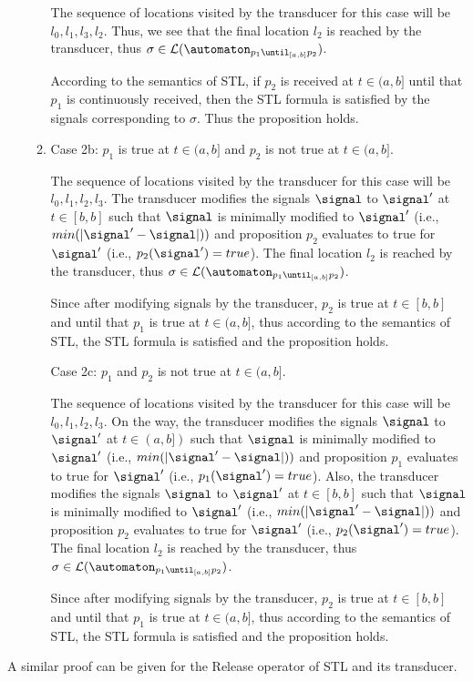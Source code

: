 \begin{enumerate}
\begin{enumerate}
            The sequence of locations visited by the transducer for this case will be $l_0, l_1, l_3, l_2$. Thus, we see that the final location $l_2$ is reached by the transducer, thus $\sigma \in \mathcal{L}(\automaton_{p_1\until_{[a,b]}p_2})$.

            According to the semantics of STL, if $p_2$ is received at $t\in (a,b]$ until that $p_1$ is continuously received, then the STL formula is satisfied by the signals corresponding to $\sigma$. Thus the proposition holds.

            \item Case 2b: $p_1$ is true at $t \in 
            (a,b]$ and $p_2$ is not true at $t\in(a,b]$.

            The sequence of locations visited by the transducer for this case will be $l_0, l_1, l_2, l_3$. The transducer modifies the signals $\signal$ to $\signal'$  at $t \in [b,b]$ such that $\signal$ is minimally modified to $\signal'$ (i.e., $min(|\signal'-\signal|))$ and  proposition $p_2$ evaluates to true for $\signal'$ (i.e., $p_2(\signal')=true$). The final location $l_2$ is reached by the transducer, thus $\sigma \in \mathcal{L}(\automaton_{p_1\until_{[a,b]}p_2})$.

            Since after modifying signals by the transducer, $p_2$ is true at $t \in [b,b]$ and until that $p_1$ is true at $t\in (a,b]$, thus according to the semantics of STL, the STL formula is satisfied and the proposition holds.

             Case 2c: $p_1$ and $p_2$ is not true at $t\in(a,b]$.

             The sequence of locations visited by the transducer for this case will be $l_0, l_1, l_2, l_3$. On the way, the transducer modifies the signals $\signal$ to $\signal'$  at $t \in (a,b])$ such that $\signal$ is minimally modified to $\signal'$ (i.e., $min(|\signal'-\signal|))$ and  proposition $p_1$ evaluates to true for $\signal'$ (i.e., $p_1(\signal')=true$). Also, the transducer modifies the signals $\signal$ to $\signal'$  at $t \in [b,b]$ such that $\signal$ is minimally modified to $\signal'$ (i.e., $min(|\signal'-\signal|))$ and  proposition $p_2$ evaluates to true for $\signal'$ (i.e., $p_2(\signal')=true$).              
             The final location $l_2$ is reached by the transducer, thus $\sigma \in \mathcal{L}(\automaton_{p_1\until_{[a,b]}p_2})$.

             Since after modifying signals by the transducer, $p_2$ is true at $t \in [b,b]$ and until that $p_1$ is true at $t\in (a,b]$, thus according to the semantics of STL, the STL formula is satisfied and the proposition holds.
        \end{enumerate}
    \end{enumerate}
A similar proof can be given for the Release operator of STL and its transducer.




